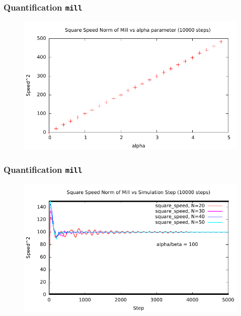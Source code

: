\documentclass[compress]{beamer}
\begin{document}
\begin{frame}
	\frametitle{Quantification \texttt{mill}}
	\begin{figure}[H]
		\includegraphics[width=1. \columnwidth]{../plots/mill_II_square_alpha_10000.pdf}
	\end{figure}
\end{frame}

\begin{frame}
	\frametitle{Quantification \texttt{mill}}	
	\begin{figure}[H]
		\includegraphics[width=1. \columnwidth]{../plots/mill_II_square_dt_allN.pdf}
	\end{figure}	
\end{frame}
\end{document}
